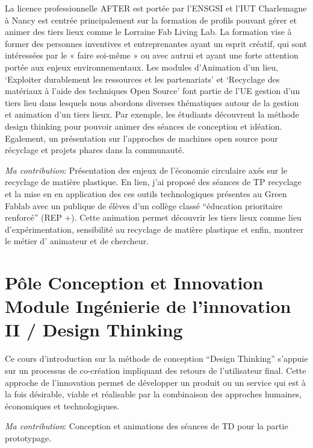 \documentclass[
  12pt,
  oneside]{book}
\begin{document}
La licence professionnelle AFTER est portée par l'ENSGSI et l'IUT Charlemagne à Nancy est centrée principalement sur la formation de profils pouvant gérer et animer des tiers lieux comme le Lorraine Fab Living Lab. La formation vise à former des personnes inventives et entreprenantes ayant un esprit créatif, qui sont intéressées par le « faire soi-même » ou avec autrui et ayant une forte attention portée aux enjeux environnementaux.
Les modules d'Animation d'un lieu, `Exploiter durablement les ressources et les partenariats' et `Recyclage des matériaux à l'aide des techniques Open Source' font partie de l'UE gestion d'un tiers lieu dans lesquels nous abordons diverses thématiques autour de la gestion et animation d'un tiers lieux. Par exemple, les étudiants découvrent la méthode design thinking pour pouvoir animer des séances de conception et idéation. Egalement, un présentation sur l'approches de machines open source pour récyclage et projets phares dans la communauté.

\emph{Ma contribution}: Présentation des enjeux de l'économie circulaire axés sur le recyclage de matière plastique. En lien, j'ai proposé des séances de TP recyclage et la mise en en application des ces outils technologiques présentes au Green Fablab avec un publique de élèves d'un collège classé ``éducation prioritaire renforcé'' (REP +). Cette animation permet découvrir les tiers lieux comme lieu d'expérimentation, sensibilité au recyclage de matière plastique et enfin, montrer le métier d' animateur et de chercheur.

\hypertarget{puxf4le-conception-et-innovation-module-inguxe9nierie-de-linnovation-ii-design-thinking}{%
\section{Pôle Conception et Innovation Module Ingénierie de l'innovation II / Design Thinking}\label{puxf4le-conception-et-innovation-module-inguxe9nierie-de-linnovation-ii-design-thinking}}

Ce cours d'introduction sur la méthode de conception ``Design Thinking'' s'appuie sur un processus de co-création impliquant des retours de l'utilisateur final. Cette approche de l'innovation permet de développer un produit ou un service qui est à la fois désirable, viable et réalisable par la combinaison des approches humaines, économiques et technologiques.

\emph{Ma contribution}: Conception et animations des séances de TD pour la partie prototypage.
\end{document}
